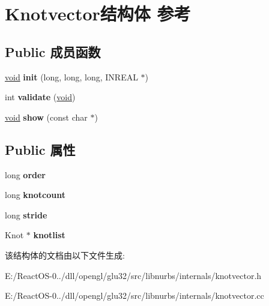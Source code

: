 \hypertarget{struct_knotvector}{}\section{Knotvector结构体 参考}
\label{struct_knotvector}
\subsection*{Public 成员函数}
\begin{DoxyCompactItemize}
\item 
\mbox{\label{struct_knotvector_ac5c38e23a9109778866644650203dd06}} 
\hyperlink{interfacevoid}{void} {\bfseries init} (long, long, long, I\+N\+R\+E\+AL $\ast$)
\item 
\mbox{\label{struct_knotvector_a3c3754e23e9635906dc732f35911ce57}} 
int {\bfseries validate} (\hyperlink{interfacevoid}{void})
\item 
\mbox{\label{struct_knotvector_a2acef7cc2b58049f4690c94b30826cf1}} 
\hyperlink{interfacevoid}{void} {\bfseries show} (const char $\ast$)
\end{DoxyCompactItemize}
\subsection*{Public 属性}
\begin{DoxyCompactItemize}
\item 
\mbox{\label{struct_knotvector_a411951f6745f344836374524ca9ff167}} 
long {\bfseries order}
\item 
\mbox{\label{struct_knotvector_abd43ea615d9101f5f75fe4eac0e43993}} 
long {\bfseries knotcount}
\item 
\mbox{\label{struct_knotvector_a4a6681c5b01fc6c62402d9421dbfd45a}} 
long {\bfseries stride}
\item 
\mbox{\label{struct_knotvector_ad2431f32dd5fd8aa40c337f8e325dd92}} 
Knot $\ast$ {\bfseries knotlist}
\end{DoxyCompactItemize}


该结构体的文档由以下文件生成\+:\begin{DoxyCompactItemize}
\item 
E\+:/\+React\+O\+S-\/0../dll/opengl/glu32/src/libnurbs/internals/knotvector.\+h\item 
E\+:/\+React\+O\+S-\/0../dll/opengl/glu32/src/libnurbs/internals/knotvector.\+cc\end{DoxyCompactItemize}

